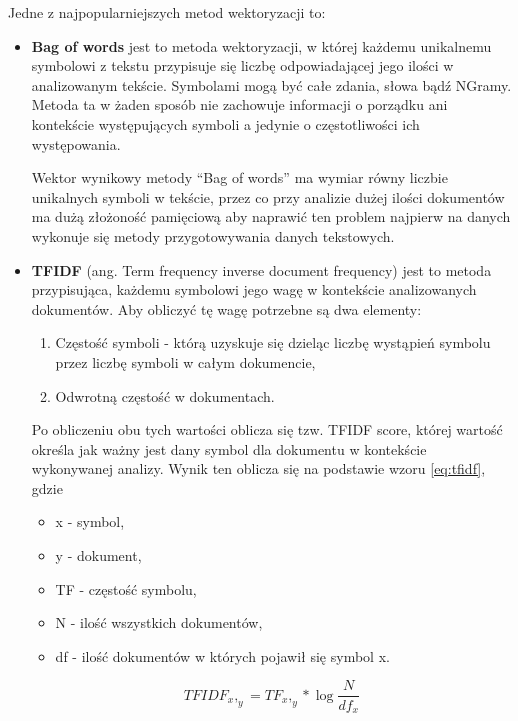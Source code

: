 Jedne z najpopularniejszych metod wektoryzacji to:
\begin{itemize}
    \item \textbf{Bag of words} jest to metoda wektoryzacji, w której każdemu unikalnemu symbolowi z tekstu przypisuje się liczbę 
    odpowiadającej jego ilości w analizowanym tekście. Symbolami mogą być całe zdania, słowa bądź NGramy. 
    Metoda ta w żaden sposób nie zachowuje informacji o porządku ani kontekście występujących symboli a jedynie o 
    częstotliwości ich występowania. 
    
    Wektor wynikowy metody ``Bag of words'' ma wymiar równy liczbie unikalnych symboli w tekście, przez co przy analizie dużej ilości 
    dokumentów ma dużą złożoność pamięciową aby naprawić ten problem najpierw na danych wykonuje się metody przygotowywania danych tekstowych.

    \item \textbf{TFIDF} (ang. Term frequency inverse document frequency) jest to metoda przypisująca, każdemu symbolowi 
    jego wagę w kontekście analizowanych dokumentów. Aby obliczyć tę wagę potrzebne są dwa elementy:
    \begin{enumerate}
        \item Częstość symboli - którą uzyskuje się dzieląc liczbę wystąpień symbolu przez liczbę symboli w całym dokumencie,
        \item Odwrotną częstość w dokumentach.
    \end{enumerate}
    Po obliczeniu obu tych wartości oblicza się tzw. TFIDF score, której wartość określa jak ważny jest dany symbol 
    dla dokumentu w kontekście wykonywanej analizy. Wynik ten oblicza się na podstawie wzoru \ref{eq:tfidf}, gdzie
    \begin{itemize}
        \item x - symbol,
        \item y - dokument,
        \item TF - częstość symbolu,
        \item N - ilość wszystkich dokumentów,
        \item df - ilość dokumentów w których pojawił się symbol x.
    \end{itemize}

    \begin{equation}
        \label{eq:tfidf}
        TFIDF_x,_y = TF_x,_y* \log{\frac{N}{df_x}}
    \end{equation}
\end{itemize}
